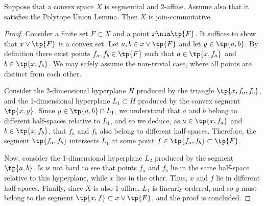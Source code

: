 \documentclass[12pt, a4paper]{article}
\begin{document}
\begin{lemma}\label{join-comm}
    Suppose that a convex space \(X\) is segmential and 2-affine. Assume also that it satisfies the Polytope Union Lemma. Then \(X\) is join-commutative.
\end{lemma}
\begin{proof}
    Consider a finite set \(F \subset X\) and a point \(x \nin \tp{F}\). It suffices to show that \(x \vee \tp{F}\) is a convex set. Let \(a, b \in x \vee \tp{F}\) and let \(y \in \tp{a, b}\). By definition there exist points \(f_a, f_b \in \tp{F}\) such that \(a \in \tp{x, f_a}\) and \(b \in \tp{x, f_b}\). We may safely assume the non-trivial case, where all points are distinct from each other.
    
    Consider the 2-dimensional hyperplane \(H\) produced by the triangle \(\tp{x, f_a, f_b}\), and the 1-dimensional hyperplane \(L_1 \subset H\) produced by the convex segment \(\tp{x, y}\). Since \(y \in \tp{a, b} \cap L_1\), we understand that \(a\) and \(b\) belong to different half-spaces relative to \(L_1\), and so we deduce, as \(a \in \tp{x, f_a}\) and \(b \in \tp{x, f_b}\), that \(f_a\) and \(f_b\) also belong to different half-spaces. Therefore, the segment \(\tp{f_a, f_b}\) intersects \(L_1\) at some point \(f \in \tp{f_a, f_b} \subset \tp{F}\).

    Now, consider the 1-dimensional hyperplane \(L_2\) produced by the segment \(\tp{a, b}\). Is is not hard to see that points \(f_a\) and \(f_b\) lie in the same half-space relative to this hyperplane, while \(x\) lies in the other. Thus, \(x\) and \(f\) lie in different half-spaces. Finally, since \(X\) is also 1-affine, \(L_1\) is linearly ordered, and so \(y\) must belong to the segment \(\tp{x, f} \subset x \vee \tp{F}\), and the proof is concluded.
\end{proof}
\end{document}
